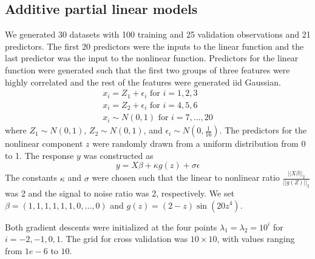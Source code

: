 \documentclass[10pt,letterpaper]{article}
\begin{document}
\subsection{Additive partial linear models}

We generated 30 datasets with 100 training and 25 validation observations and 21 predictors. The first 20 predictors were the inputs to the linear function and the last predictor was the input to the nonlinear function. Predictors for the linear function were generated such that the first two groups of three features were highly correlated and the rest of the features were generated iid Gaussian.
\begin{equation}
\begin{array}{c}
x_i = Z_1 + \epsilon_i \text{ for } i=1, 2, 3 \\
x_i = Z_2 + \epsilon_i \text{ for } i= 4, 5, 6 \\
x_i \sim N(0,1) \text{ for } i = 7, ..., 20
\end{array}
\end{equation}
where $Z_1 \sim N(0,1)$, $Z_2 \sim N(0,1)$, and $\epsilon_i \sim N(0, \frac{1}{16})$. The predictors for the nonlinear component $z$ were randomly drawn from a uniform distribution from 0 to 1. The response $y$ was constructed as
\begin{equation}
y = X\beta + \kappa g(z) + \sigma \epsilon
\end{equation}
The constants $\kappa$ and $\sigma$ were chosen such that the linear to nonlinear ratio $\frac{||X\beta||_2}{||g(Z)||_2}$ was 2 and the signal to noise ratio was 2, respectively. We set $\beta = (1, 1, 1, 1, 1, 1, 0, ..., 0)$ and $g(z) =(2-z)\sin(20z^4)$.

Both gradient descents were initialized at the four points $\lambda_1 = \lambda_2 = 10^i$ for $i=-2, -1, 0, 1$. The grid for cross validation was $10 \times 10$, with values ranging from $1e-6$ to $10$.
\end{document}
